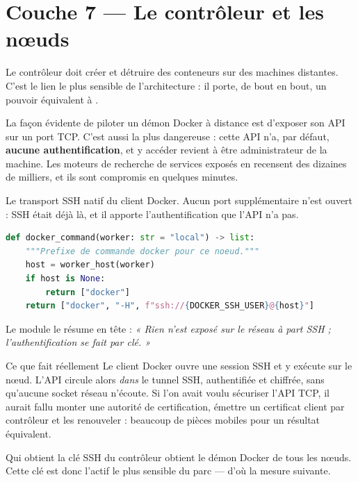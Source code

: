 \chapter{Couche 7 — Le contrôleur et les nœuds}

Le contrôleur doit créer et détruire des conteneurs sur des machines distantes.
C'est le lien le plus sensible de l'architecture : il porte, de bout en bout,
un pouvoir équivalent à .


\menace
La façon évidente de piloter un démon Docker à distance est d'exposer son API
sur un port TCP. C'est aussi la plus dangereuse : cette API n'a, par défaut,
\textbf{aucune authentification}, et y accéder revient à être administrateur de
la machine. Les moteurs de recherche de services exposés en recensent des
dizaines de milliers, et ils sont compromis en quelques minutes.

\parade
Le transport SSH natif du client Docker. Aucun port supplémentaire n'est
ouvert : SSH était déjà là, et il apporte l'authentification que l'API n'a pas.

\danslecode
\begin{lstlisting}[language=Python]
def docker_command(worker: str = "local") -> list:
    """Prefixe de commande docker pour ce noeud."""
    host = worker_host(worker)
    if host is None:
        return ["docker"]
    return ["docker", "-H", f"ssh://{DOCKER_SSH_USER}@{host}"]
\end{lstlisting}

Le module le résume en tête : \emph{« Rien n'est exposé sur le réseau à part
SSH ; l'authentification se fait par clé. »}

\begin{notion}{Ce que fait réellement }
Le client Docker ouvre une session SSH et y exécute
 sur le nœud. L'API circule alors \emph{dans} le
tunnel SSH, authentifiée et chiffrée, sans qu'aucune socket réseau n'écoute.
Si l'on avait voulu sécuriser l'API TCP, il aurait fallu monter une autorité de
certification, émettre un certificat client par contrôleur et les renouveler :
beaucoup de pièces mobiles pour un résultat équivalent.
\end{notion}

\limite
Qui obtient la clé SSH du contrôleur obtient le démon Docker de tous les nœuds.
Cette clé est donc l'actif le plus sensible du parc --- d'où la mesure
suivante.


